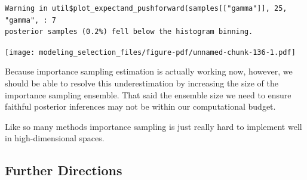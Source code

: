 \documentclass[
  letterpaper,
  DIV=11,
  numbers=noendperiod]{scrartcl}
\newenvironment{Shaded}{\begin{snugshade}}{\end{snugshade}}
\newcommand{\AttributeTok}[1]{\textcolor[rgb]{0.40,0.45,0.13}{#1}}
\newcommand{\DecValTok}[1]{\textcolor[rgb]{0.68,0.00,0.00}{#1}}
\newcommand{\FloatTok}[1]{\textcolor[rgb]{0.68,0.00,0.00}{#1}}
\newcommand{\FunctionTok}[1]{\textcolor[rgb]{0.28,0.35,0.67}{#1}}
\newcommand{\NormalTok}[1]{\textcolor[rgb]{0.00,0.23,0.31}{#1}}
\newcommand{\SpecialCharTok}[1]{\textcolor[rgb]{0.37,0.37,0.37}{#1}}
\newcommand{\StringTok}[1]{\textcolor[rgb]{0.13,0.47,0.30}{#1}}
\begin{document}
\begin{Shaded}
\end{Shaded}

\begin{verbatim}
Warning in util$plot_expectand_pushforward(samples[["gamma"]], 25, "gamma", : 7
posterior samples (0.2%) fell below the histogram binning.
\end{verbatim}

\texttt{[image: modeling\_selection\_files/figure-pdf/unnamed-chunk-136-1.pdf]}

Because importance sampling estimation is actually working now, however,
we should be able to resolve this underestimation by increasing the size
of the importance sampling ensemble. That said the ensemble size we need
to ensure faithful posterior inferences may not be within our
computational budget.

Like so many methods importance sampling is just really hard to
implement well in high-dimensional spaces.

\subsection{Further Directions}\label{further-directions}
\end{document}
